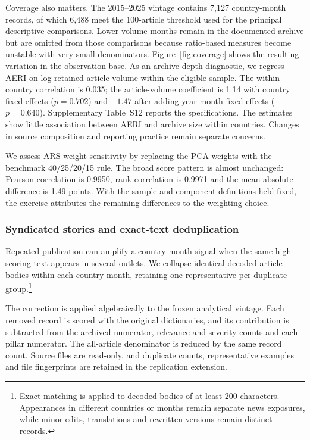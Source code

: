 \documentclass[12pt]{article}
\begin{document}
Coverage also matters. The 2015--2025 vintage contains 7,127 country-month records, of which 6,488 meet the 100-article threshold used for the principal descriptive comparisons. Lower-volume months remain in the documented archive but are omitted from those comparisons because ratio-based measures become unstable with very small denominators. Figure~\ref{fig:coverage} shows the resulting variation in the observation base. As an archive-depth diagnostic, we regress AERI on log retained article volume within the eligible sample. The within-country correlation is 0.035; the article-volume coefficient is 1.14 with country fixed effects ($p=0.702$) and $-1.47$ after adding year-month fixed effects ($p=0.640$). Supplementary Table~S12 reports the specifications. The estimates show little association between AERI and archive size within countries. Changes in source composition and reporting practice remain separate concerns.

We assess ARS weight sensitivity by replacing the PCA weights with the benchmark 40/25/20/15 rule. The broad score pattern is almost unchanged: Pearson correlation is 0.9950, rank correlation is 0.9971 and the mean absolute difference is 1.49 points. With the sample and component definitions held fixed, the exercise attributes the remaining differences to the weighting choice.

\subsubsection{Syndicated stories and exact-text deduplication}\label{sec:deduplication}
Repeated publication can amplify a country-month signal when the same high-scoring text appears in several outlets. We collapse identical decoded article bodies within each country-month, retaining one representative per duplicate group.\footnote{Exact matching is applied to decoded bodies of at least 200 characters. Appearances in different countries or months remain separate news exposures, while minor edits, translations and rewritten versions remain distinct records.}

The correction is applied algebraically to the frozen analytical vintage. Each removed record is scored with the original dictionaries, and its contribution is subtracted from the archived numerator, relevance and severity counts and each pillar numerator. The all-article denominator is reduced by the same record count. Source files are read-only, and duplicate counts, representative examples and file fingerprints are retained in the replication extension.
\end{document}
